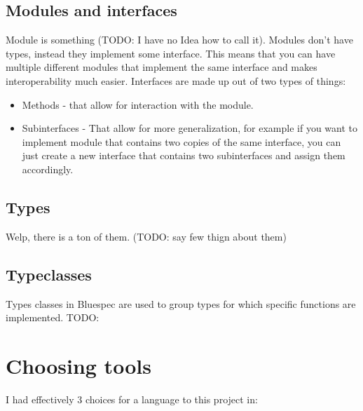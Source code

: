 \documentclass[14pt]{report}
\begin{document}
\subsection{Modules and interfaces}
Module is something (TODO: I have no Idea how to call it). Modules don't have types, instead they implement some interface. This means that you can have multiple different modules that implement the same interface and makes interoperability much easier. Interfaces are made up out of two types of things:
    \begin{itemize}
        \item Methods - that allow for interaction with the module.
        \item Subinterfaces - That allow for more generalization, for example if you want to implement module that contains two copies of the same interface, you can just create a new interface that contains two subinterfaces and assign them accordingly.
    \end{itemize}

\subsection{Types}
Welp, there is a ton of them. (TODO: say few thign about them)
\subsection{Typeclasses}
Types classes in Bluespec are used to group types for which specific functions are implemented. TODO:

\section{Choosing tools}
I had effectively 3 choices for a language to this project in:
\end{document}
